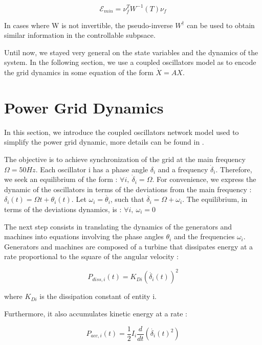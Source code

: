 \documentclass[conference]{IEEEtran}
\begin{document}
\begin{equation}
\label{eq:energy}
 \mathcal{E}_{min} = \nu_f^T W^{-1}(T) \nu_f
\end{equation}

In cases where W is not invertible, the pseudo-inverse $W^{\dagger}$ can be used to obtain similar information in the controllable subpsace. 

Until now, we stayed very general on the state variables and the dynamics of the system. In the following section, we use a coupled oscillators model as to encode the grid dynamics in some equation of the form $\dot{X}=AX$.



\section{Power Grid Dynamics}
\label{sec:The_Model}

In this section, we introduce the coupled oscillators network model used to simplify the power grid dynamic, more details can be found in \cite{Filatrella2008}.

 The objective is to achieve synchronization of the grid at the main frequency $ \Omega = 50 Hz $. Each oscillator i has a phase angle $ \delta_i $ and a frequency $ \dot{\delta}_i $. Therefore, we seek an equilibrium of the form : $ \forall i,\ \dot{\delta}_i = \Omega $. For convenience, we express the dynamic of the oscillators in terms of the deviations from the main frequency : $ \delta_i(t) = \Omega t + \theta_i(t) $. Let $ \omega_i = \dot{\theta_i} $, such that $ \dot{\delta_i} = \Omega + \omega_i $. The equilibrium, in terms of the deviations dynamics, is : $ \forall i,\ \omega_i = 0 $

The next step consists in translating the dynamics of the generators and machines into equations involving the phase angles $ \theta_i $ and the frequencies $ \omega_i$. Generators and machines are composed of a turbine that dissipates energy at a rate proportional to the square of the angular velocity : 

\begin{equation}
\label{eq:diss}
  P_{diss, i}(t) = K_{Di}(\dot{\delta_i}(t))^2 
\end{equation}

where $ K_{Di} $ is the dissipation constant of entity i.

Furthermore, it also accumulates kinetic energy at a rate : 

\begin{equation} 
\label{eq:acc}
P_{acc,i}(t) = \frac{1}{2}I_i\frac{d}{dt} \left( \dot{ \delta_i }(t)^2 \right)
\end{equation} 
\end{document}

